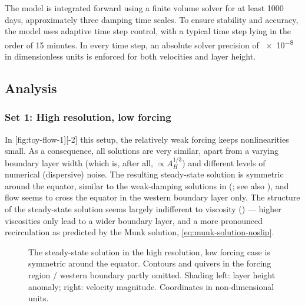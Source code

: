 The model is integrated forward using a finite volume solver for at least 1000 days, \ie approximately three damping time scales. To ensure stability and accuracy, the model uses adaptive time step control, with a typical time step lying in the order of 15 minutes. In every time step, an absolute solver precision of \num{e-8} in dimensionless units is enforced for both velocities and layer height.

\clearpage
\FloatBlock
\subsection{Analysis}
\subsubsection{Set 1: High resolution, low forcing}
In%
[fig:toy-flow-1]{}[-2]%
%
this setup, the relatively weak forcing keeps nonlinearities small. As a consequence, all solutions are very similar, apart from a varying boundary layer width (which is, after all, \(\propto A_H^{1/3}\)) and different levels of numerical (dispersive) noise. The resulting steady-state solution is symmetric around the equator, similar to the weak-damping solutions in \cite{greatbatch} (; see also ), and flow seems to cross the equator in the western boundary layer only. The structure of the steady-state solution seems largely indifferent to viscosity () --- higher viscosities only lead to a wider boundary layer, and a more pronounced recirculation as predicted by the Munk solution, \ie \eqref{eq:munk-solution-noslip}.

\begin{figure}[p]
	\centering
	\caption[Steady-state solution of the shallow-water model for high resolution and low forcing.]{The steady-state solution in the high resolution, low forcing case is symmetric around the equator. Contours and quivers in the forcing region / western boundary partly omitted. Shading left: layer height anomaly; right: velocity magnitude. Coordinates in non-dimensional units.}
	\label{fig:toy-steady-state}
\end{figure}

